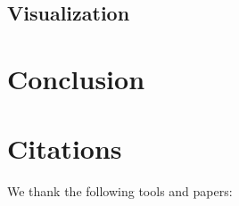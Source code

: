 \documentclass{article}
\begin{document}
\subsection{Visualization}



\section{Conclusion}



\section{Citations}

We thank the following tools and papers: \\\\
\end{document}
